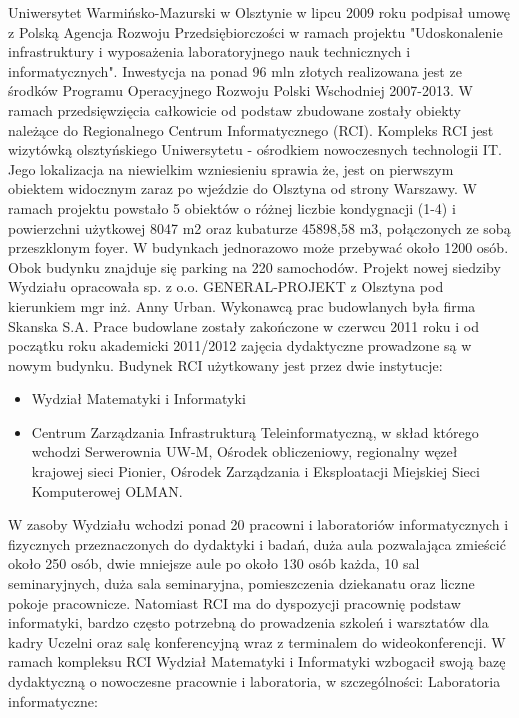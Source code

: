 \documentclass[a4paper,12pt]{article}
\begin{document}
Uniwersytet Warmińsko-Mazurski w Olsztynie w lipcu 2009 roku podpisał umowę z Polską Agencja Rozwoju
Przedsiębiorczości w ramach projektu "Udoskonalenie infrastruktury i wyposażenia laboratoryjnego nauk
technicznych i informatycznych". Inwestycja na ponad 96 mln złotych realizowana jest ze środków Programu
Operacyjnego Rozwoju Polski Wschodniej 2007-2013. W ramach przedsięwzięcia całkowicie od podstaw
zbudowane zostały obiekty należące do Regionalnego Centrum Informatycznego (RCI).
\newline \newline Kompleks RCI jest wizytówką olsztyńskiego Uniwersytetu - ośrodkiem nowoczesnych technologii IT. Jego
lokalizacja na niewielkim wzniesieniu sprawia że, jest on pierwszym obiektem widocznym zaraz po wjeździe
do Olsztyna od strony Warszawy. W ramach projektu powstało 5 obiektów o różnej liczbie kondygnacji (1-4) i
powierzchni użytkowej 8047 m2 oraz kubaturze 45898,58 m3, połączonych ze sobą przeszklonym foyer. W
budynkach jednorazowo może przebywać około 1200 osób. Obok budynku znajduje się parking na 220
samochodów.
\newline \newline Projekt nowej siedziby Wydziału opracowała sp. z o.o. GENERAL-PROJEKT z Olsztyna pod kierunkiem mgr
inż. Anny Urban. Wykonawcą prac budowlanych była firma Skanska S.A. Prace budowlane zostały
zakończone w czerwcu 2011 roku i od początku roku akademicki 2011/2012 zajęcia dydaktyczne prowadzone
są w nowym budynku.
\newline \newline Budynek RCI użytkowany jest przez dwie instytucje:

\begin{itemize}
\item Wydział Matematyki i Informatyki
\item Centrum Zarządzania Infrastrukturą Teleinformatyczną, w skład którego wchodzi Serwerownia UW-M,
Ośrodek obliczeniowy, regionalny węzeł krajowej sieci Pionier, Ośrodek Zarządzania i Eksploatacji
Miejskiej Sieci Komputerowej OLMAN.
\end{itemize}
{}W zasoby Wydziału wchodzi ponad 20 pracowni i laboratoriów informatycznych i fizycznych przeznaczonych
do dydaktyki i badań, duża aula pozwalająca zmieścić około 250 osób, dwie mniejsze aule po około 130 osób
każda, 10 sal seminaryjnych, duża sala seminaryjna, pomieszczenia dziekanatu oraz liczne pokoje pracownicze.
Natomiast RCI ma do dyspozycji pracownię podstaw informatyki, bardzo często potrzebną do prowadzenia
szkoleń i warsztatów dla kadry Uczelni oraz salę konferencyjną wraz z terminalem do wideokonferencji.
\newline \newline W ramach kompleksu RCI Wydział Matematyki i Informatyki wzbogacił swoją bazę dydaktyczną o
nowoczesne pracownie i laboratoria, w szczególności:
\newline \newline Laboratoria informatyczne:
\end{document}
